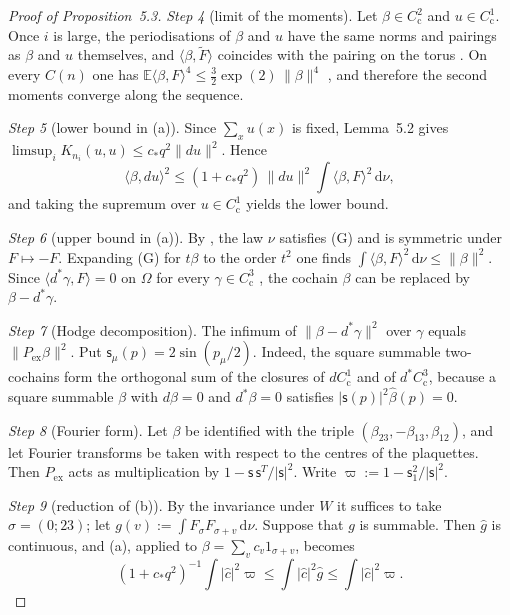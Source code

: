 \documentclass[11pt,letterpaper,reqno]{amsart}
\theoremstyle{definition}
\begin{document}
\begin{proof}[Proof of Proposition~5.3]
\emph{Step 4} (limit of the moments).
Let $\beta\in C^2_{\mathrm c}$ and $u\in C^1_{\mathrm c}$.
Once $i$ is large, the periodisations of $\beta$ and $u$ have the same norms and pairings as $\beta$ and $u$ themselves, and $\langle\beta,\widetilde F\rangle$ coincides with the pairing on the torus \cite[Lemma~2.14\,(b)]{QEDII}.
On every $C(n)$ one has $\mathbb E\langle\beta,F\rangle^4\le\frac32\exp(2)\,\|\beta\|^4$ \cite[Theorem~6.27\,(b)]{QEDII}, and therefore the second moments converge along the sequence.

\emph{Step 5} (lower bound in (a)).
Since $\sum_xu(x)$ is fixed, Lemma~5.2 gives $\limsup_iK_{n_i}(u,u)\le c_*q^2\|du\|^2$.
Hence
\begin{equation*}
\langle\beta,du\rangle^2\le(1+c_*q^2)\,\|du\|^2\int\langle\beta,F\rangle^2\,\mathrm d\nu,
\end{equation*}
and taking the supremum over $u\in C^1_{\mathrm c}$ yields the lower bound.

\emph{Step 6} (upper bound in (a)).
By \cite[Theorem~1.2]{QEDII}, the law $\nu$ satisfies (G) and is symmetric under $F\mapsto-F$.
Expanding (G) for $t\beta$ to the order $t^2$ one finds $\int\langle\beta,F\rangle^2\,\mathrm d\nu\le\|\beta\|^2$.
Since $\langle d^*\gamma,F\rangle=0$ on $\Omega$ for every $\gamma\in C^3_{\mathrm c}$ \cite[Lemma~2.14\,(a)]{QEDII}, the cochain $\beta$ can be replaced by $\beta-d^*\gamma$.

\emph{Step 7} (Hodge decomposition).
The infimum of $\|\beta-d^*\gamma\|^2$ over $\gamma$ equals $\|P_{\mathrm{ex}}\beta\|^2$.
Put $\mathsf s_\mu(p)=2\sin(p_\mu/2)$.
Indeed, the square summable two-cochains form the orthogonal sum of the closures of $dC^1_{\mathrm c}$ and of $d^*C^3_{\mathrm c}$, because a square summable $\beta$ with $d\beta=0$ and $d^*\beta=0$ satisfies $|\mathsf s(p)|^2\hat\beta(p)=0$.

\emph{Step 8} (Fourier form).
Let $\beta$ be identified with the triple $(\beta_{23},-\beta_{13},\beta_{12})$, and let Fourier transforms be taken with respect to the centres of the plaquettes.
Then $P_{\mathrm{ex}}$ acts as multiplication by $1-\mathsf s\,\mathsf s^{T}/|\mathsf s|^2$.
Write $\varpi:=1-\mathsf s_1^2/|\mathsf s|^2$.

\emph{Step 9} (reduction of (b)).
By the invariance under $W$ it suffices to take $\sigma=(0;23)$; let $g(v):=\int F_\sigma F_{\sigma+v}\,\mathrm d\nu$.
Suppose that $g$ is summable.
Then $\hat g$ is continuous, and (a), applied to $\beta=\sum_vc_v1_{\sigma+v}$, becomes
\begin{equation*}
(1+c_*q^2)^{-1}\int|\hat c|^2\varpi\le\int|\hat c|^2\hat g\le\int|\hat c|^2\varpi.
\end{equation*}


\end{proof}
\end{document}
